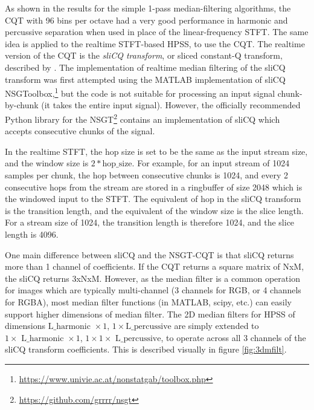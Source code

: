 \documentclass[letter,12pt]{article}
\begin{document}
As shown in the results for the simple 1-pass median-filtering algorithms, the CQT with 96 bins per octave had a very good performance in harmonic and percussive separation when used in place of the linear-frequency STFT. The same idea is applied to the realtime STFT-based HPSS, to use the CQT. The realtime version of the CQT is the \textit{sliCQ transform}, or sliced constant-Q transform, described by \citet{rtcqt}. The implementation of realtime median filtering of the sliCQ transform was first attempted using the MATLAB implementation of sliCQ NSGToolbox,\footnote{\url{https://www.univie.ac.at/nonstatgab/toolbox.php}} but the code is not suitable for processing an input signal chunk-by-chunk (it takes the entire input signal). However, the officially recommended Python library for the NSGT\footnote{\url{https://github.com/grrrr/nsgt}} contains an implementation of sliCQ which accepts consecutive chunks of the signal.

In the realtime STFT, the hop size is set to be the same as the input stream size, and the window size is $2*\text{hop\_size}$. For example, for an input stream of 1024 samples per chunk, the hop between consecutive chunks is 1024, and every 2 consecutive hops from the stream are stored in a ringbuffer of size 2048 which is the windowed input to the STFT. The equivalent of hop in the sliCQ transform is the transition length, and the equivalent of the window size is the slice length. For a stream size of 1024, the transition length is therefore 1024, and the slice length is 4096.

One main difference between sliCQ and the NSGT-CQT is that sliCQ returns more than 1 channel of coefficients. If the CQT returns a square matrix of NxM, the sliCQ returns 3xNxM. However, as the median filter is a common operation for images which are typically multi-channel (3 channels for RGB, or 4 channels for RGBA), most median filter functions (in MATLAB, scipy, etc.) can easily support higher dimensions of median filter. The 2D median filters for HPSS of dimensions $\text{L\_harmonic } \times 1$, $1 \times \text{L\_percussive}$ are simply extended to $1 \times \text{ L\_harmonic } \times 1$, $1 \times 1 \times \text{ L\_percussive}$, to operate across all 3 channels of the sliCQ transform coefficients. This is described visually in figure \ref{fig:3dmfilt}.
\end{document}
